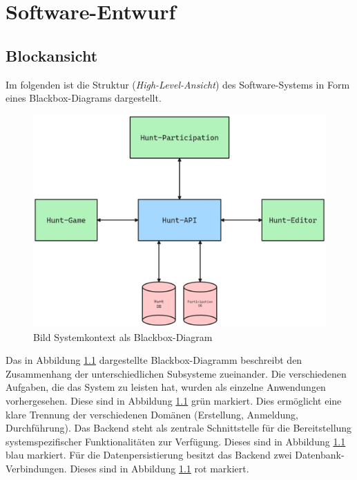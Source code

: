 \chapter{Software-Entwurf} \label{cha:swentwurf}

\section{Blockansicht}

Im folgenden ist die Struktur (\textit{High-Level-Ansicht}) des Software-Systems in Form eines Blackbox-Diagrams dargestellt.

\begin{figure}[H]
    \centering
    \includegraphics[width=\textwidth]{images/PrAr-Software-Entwurf-Blockansicht.png}
    \caption{Bild Systemkontext als Blackbox-Diagram}
    \label{fig:swentwurf:blackbox}
\end{figure}

Das in Abbildung \ref{fig:swentwurf:blackbox} dargestellte Blackbox-Diagramm beschreibt den Zusammenhang der unterschiedlichen Subsysteme zueinander. Die verschiedenen Aufgaben, die das System zu leisten hat, wurden als einzelne Anwendungen vorhergesehen. Diese sind in Abbildung \ref{fig:swentwurf:blackbox} grün markiert. Dies ermöglicht eine klare Trennung der verschiedenen Domänen (Erstellung, Anmeldung, Durchführung). Das Backend steht als zentrale Schnittstelle für die Bereitstellung systemspezifischer Funktionalitäten zur Verfügung. Dieses sind in Abbildung \ref{fig:swentwurf:blackbox} blau markiert. Für die Datenpersistierung besitzt das Backend zwei Datenbank-Verbindungen. Dieses sind in Abbildung \ref{fig:swentwurf:blackbox} rot markiert.

